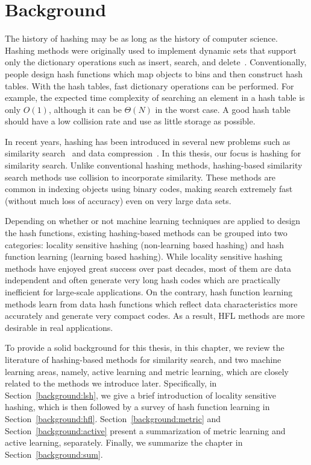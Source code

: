 
\chapter{Background}
\label{chap:background}

The history of hashing may be as long as the history of computer science. Hashing methods were originally used to implement dynamic sets that support only the dictionary operations such as insert, search, and delete~\cite{cormen2001book}. Conventionally, people design hash functions which map objects to bins and then construct hash tables. With the hash tables, fast dictionary operations can be performed. For example, the expected time complexity of searching an element in a hash table is only $ O(1) $, although it can be $ \Theta(N) $ in the worst case. A good hash table should have a low collision rate and use as little storage as possible.

In recent years, hashing has been introduced in several new problems such as similarity search~\cite{gionis1999vldb,salakhutdinov2009ijar} and data compression~\cite{shi2009aistats,weinberger2009icml,li2011nips}. In this thesis, our focus is hashing for similarity search.
Unlike conventional hashing methods, hashing-based similarity search methods use collision to incorporate similarity. These methods are common in indexing objects using binary codes, making search extremely fast (without much loss of accuracy) even on very large data sets.

Depending on whether or not machine learning techniques are applied to design the hash functions, existing hashing-based methods can be grouped into two categories: locality sensitive hashing (\aka non-learning based hashing) and hash function learning (\aka learning based hashing). While locality sensitive hashing methods have enjoyed great success over past decades, most of them are data independent and often generate very long hash codes which are practically inefficient for large-scale applications. On the contrary, hash function learning methods learn from data hash functions which reflect data characteristics more accurately and generate very compact codes. As a result, \mbox{HFL} methods are more desirable in real applications. 

To provide a solid background for this thesis, in this chapter, we review the literature of hashing-based methods for similarity search, and two machine learning areas, namely, active learning and metric learning, which are closely related to the methods we introduce later. Specifically, in Section~\ref{background:lsh}, we give a brief introduction of locality sensitive hashing, which is then followed by a survey of hash function learning in Section~\ref{background:hfl}. Section~\ref{background:metric} and Section~\ref{background:active} present a summarization of metric learning and active learning, separately. Finally, we summarize the chapter in Section~\ref{background:sum}.

